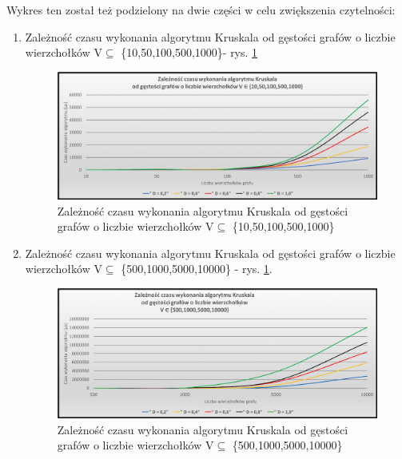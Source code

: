 \begin{itemize}
\newpage
 Wykres ten został też podzielony na dwie części w celu zwiększenia czytelności:
  \begin{enumerate}
 	\item Zależność czasu wykonania algorytmu Kruskala od gęstości grafów o liczbie wierzchołków V$\subseteq$ \{10,50,100,500,1000\}- rys. \ref{fig: ww2}
 	
\begin{figure}[htb!]
	\centering
	\includegraphics[width=1\textwidth]{tex/fig/k2_10_1000}
	\caption{Zależność czasu wykonania algorytmu Kruskala od gęstości grafów o liczbie wierzchołków V$\subseteq$ \{10,50,100,500,1000\}}
	\label{fig: ww2}
\end{figure}

 	\item Zależność czasu wykonania algorytmu Kruskala od gęstości grafów o liczbie wierzchołków V$\subseteq$ \{500,1000,5000,10000\}  - rys. \ref{fig: ww2}.
 	
 	\begin{figure}[htb!]
 		\centering
 		\includegraphics[width=1\textwidth]{tex/fig/k22}
 		\caption{Zależność czasu wykonania algorytmu Kruskala od gęstości grafów o liczbie wierzchołków V$\subseteq$ \{500,1000,5000,10000\} }
 		\label{fig: ww22}
 	\end{figure}
 \end{enumerate}


\end{itemize}
